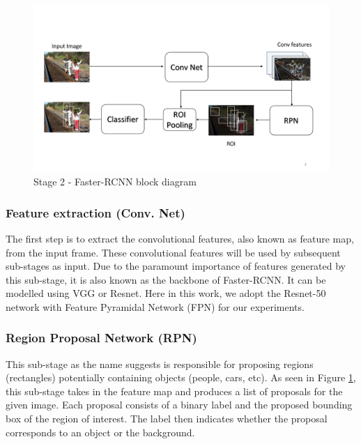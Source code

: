 \begin{figure}
    \centering
    \includegraphics[width=\linewidth,trim={0 80 0 120},clip]{images/faster-rcnn-pipeline}
    \caption{Stage 2 - Faster-RCNN block diagram}
    \label{fig:faster-rcnn-pipeline}
\end{figure}

\vspace{5pt}
\subsubsection{Feature extraction (Conv. Net)}
\label{sec:feature-extraction}
The first step is to extract the convolutional features, also known as feature map, from the input frame. These convolutional features will be used by subsequent sub-stages as input. Due to the paramount importance of features generated by this sub-stage, it is also known as the backbone of Faster-RCNN. It can be modelled using VGG\cite{simonyan2014very} or Resnet\cite{he2016deep}. Here in this work, we adopt the Resnet-50 network with Feature Pyramidal Network (FPN) \cite{lin2017feature} for our experiments. 

\vspace{5pt}
\subsubsection{Region Proposal Network (RPN)}
This sub-stage as the name suggests is responsible for proposing regions (rectangles) potentially containing objects (people, cars, etc). As seen in Figure \ref{fig:faster-rcnn-pipeline}, this sub-stage takes in the feature map and produces a list of proposals for the given image. Each proposal consists of a binary label and the proposed bounding box of the region of interest. The label then indicates whether the proposal corresponds to an object or the background. 

